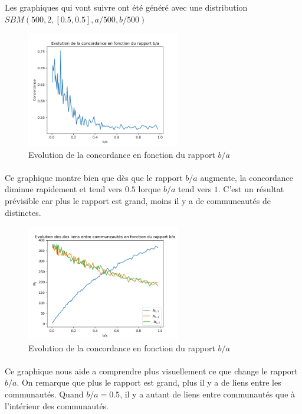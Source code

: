 \subsubsection{}
\paragraph*{}
Les graphiques qui vont suivre ont été généré avec une distribution
 $SBM(500,2,[0.5,0.5],a/500,b/500)$
\begin{figure}[H]
    \centering
    \includegraphics[width=0.6\textwidth]{figs/concordance_a_b.png}
    \caption{Evolution de la concordance en fonction du rapport $b/a$}
\end{figure}
\paragraph*{}
Ce graphique montre bien que dès que le rapport $b/a$ augmente, la concordance diminue
rapidement et tend vers $0.5$ lorque $b/a$ tend vers $1$. C'est un résultat prévisible
car plus le rapport est grand, moins il y a de communeautés de distinctes. 
\begin{figure}[H]
    \centering
    \includegraphics[width=0.6\textwidth]{figs/nij.png}
    \caption{Evolution de la concordance en fonction du rapport $b/a$}
\end{figure}
\paragraph*{}
Ce graphique nous aide a comprendre plus visuellement ce que change le rapport 
$b/a$. On remarque que plus le rapport est grand, plus il y a de liens entre les 
communautés. Quand $b/a = 0.5$, il y a autant de liens entre communautés que à 
l'intérieur des communautés. 

